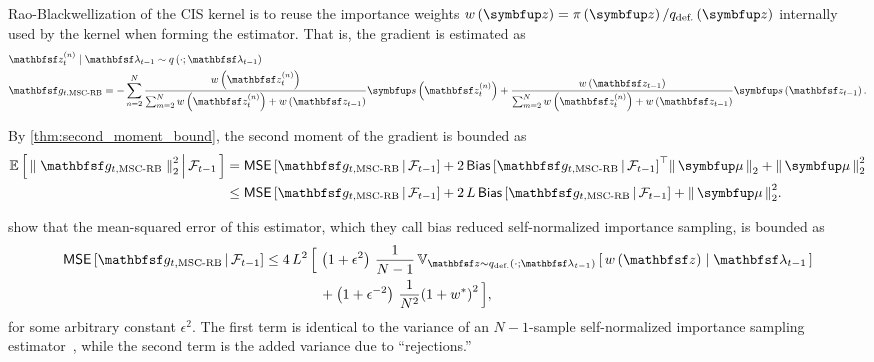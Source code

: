 \begin{proofEnd}
  Rao-Blackwellization of the CIS kernel is to reuse the importance weights \(w\left(\vz\right) = \pi\left(\vz\right) / q_{\text{def.}}\left(\vz\right)\) internally used by the kernel when forming the estimator.
  That is, the gradient is estimated as
  \begin{align*}
    &\rvvz^{(n)}_t \mid \rvvlambda_{t-1} \sim q\left(\cdot; \rvvlambda_{t-1}\right) \\
    &\rvvg_{t,\text{MSC-RB}} = -\sum^{N}_{n=2} \frac{w\left(\rvvz^{(n)}_t\right)}{\sum^{N}_{m=2}w\left(\rvvz^{(n)}_t\right) + w\left(\rvvz_{t-1}\right)} \vs\left(\rvvz^{(n)}_t\right) + \frac{w\left(\rvvz_{t-1}\right)}{\sum^{N}_{m=2}w\left(\rvvz^{(n)}_t\right) + w\left(\rvvz_{t-1}\right)} \vs\left(\rvvz_{t-1}\right).
  \end{align*}

  By \cref{thm:second_moment_bound}, the second moment of the gradient is bounded as
  \begin{alignat}{2}
    \E{ {\parallel \rvvg_{t,\text{MSC-RB}} \parallel}_2^2 \,\middle|\, \mathcal{F}_{t-1} } 
    &=
    \mathsf{MSE}\left[ \rvvg_{t, \text{MSC-RB}} \,\middle|\, \mathcal{F}_{t-1} \right]
    +
    2 \, {\mathsf{Bias}\left[ \rvvg_{t, \text{MSC-RB}} \,\middle|\, \mathcal{F}_{t-1} \right]}^{\top} \norm{\vmu}_2
    + \norm{\vmu}^2_2
    \nonumber
    \\
    &\leq
    \mathsf{MSE}\left[ \rvvg_{t, \text{MSC-RB}} \,\middle|\, \mathcal{F}_{t-1} \right]
    +
    2 \, L \, {\mathsf{Bias}\left[ \rvvg_{t, \text{MSC-RB}} \,\middle|\, \mathcal{F}_{t-1} \right]}
    + \norm{\vmu}^2_2.
    \label{eq:mscrb_decomp}
  \end{alignat}
  
  \citet[Theorem 3]{cardoso_brsnis_2022} show that the mean-squared error of this estimator, which they call bias reduced self-normalized importance sampling, is bounded as
  \begin{align*}
    \mathsf{MSE}\left[ \rvvg_{t,\text{MSC-RB}} \,\middle|\, \mathcal{F}_{t-1} \right] \leq
    4\,L^2 \, \Big[\,&
     \left( 1 + \epsilon^2 \right)\, \frac{1}{N-1}\,\Vsub{\rvvz \sim q_{\text{def.}}\left(\cdot; \rvvlambda_{t-1}\right)}{w\left(\rvvz\right) \mid \rvvlambda_{t-1}} 
     \\
     &+
     \left(1 + \epsilon^{-2} \right)\, \frac{1}{N^2} {\left(1 + w^*\right)}^2 
    \,\Big],
  \end{align*}
  for some arbitrary constant \(\epsilon^2\).
  The first term is identical to the variance of an \(N-1\)-sample self-normalized importance sampling estimator~\citep{10.1214/17-STS611}, while the second term is the added variance due to ``rejections.''


\end{proofEnd}

